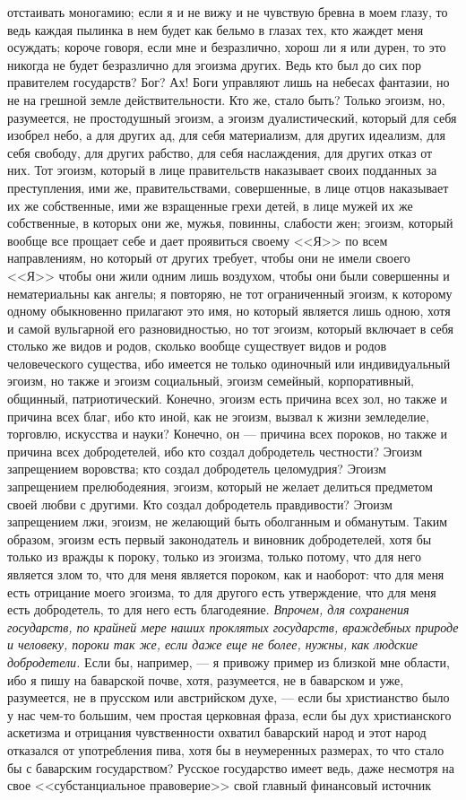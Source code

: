 \documentclass[12pt]{article}
\begin{document}
отстаивать моногамию; если я и не вижу и не чувствую бревна в моем глазу, то ведь каждая пылинка в нем будет как бельмо в глазах тех, кто жаждет меня осуждать; короче говоря, если мне и безразлично, хорош ли я или дурен, то это никогда не будет безразлично для эгоизма других. Ведь кто был до сих пор правителем государств? Бог? Ах! Боги управляют лишь на небесах фантазии, но не на грешной земле действительности. Кто же, стало быть? Только эгоизм, но, разумеется, не простодушный эгоизм, а эгоизм дуалистический, который для себя изобрел небо, а для других ад, для себя материализм, для других идеализм, для себя свободу, для других рабство, для себя наслаждения, для других отказ от них. Тот эгоизм, который в лице правительств наказывает своих подданных за преступления, ими же, правительствами, совершенные, в лице отцов наказывает их же собственные, ими же взращенные грехи детей, в лице мужей их же собственные, в которых они же, мужья, повинны, слабости жен; эгоизм, который вообще все прощает себе и дает проявиться своему <<Я>> по всем направлениям, но который от других требует, чтобы они не имели своего <<Я>>  чтобы они жили одним лишь воздухом, чтобы они были совершенны и нематериальны как ангелы; я повторяю, не тот ограниченный эгоизм, к которому одному обыкновенно прилагают это имя, но который является лишь одною, хотя и самой вульгарной его разновидностью, но тот эгоизм, который включает в себя столько же видов и родов, сколько вообще существует видов и родов человеческого существа, ибо имеется не только одиночный или индивидуальный эгоизм, но также и эгоизм социальный, эгоизм семейный, корпоративный, общинный, патриотический. Конечно, эгоизм есть причина всех зол, но также и причина всех благ, ибо кто иной, как не эгоизм, вызвал к жизни земледелие, торговлю, искусства и науки? Конечно, он --- причина всех пороков, но также и причина всех добродетелей, ибо кто создал добродетель честности? Эгоизм запрещением воровства; кто создал добродетель целомудрия? Эгоизм запрещением прелюбодеяния, эгоизм, который не желает делиться предметом своей любви с другими. Кто создал добродетель правдивости? Эгоизм запрещением лжи, эгоизм, не желающий быть оболганным и обманутым. Таким образом, эгоизм есть первый законодатель и виновник добродетелей, хотя бы только из вражды к пороку, только из эгоизма, только потому, что для него является злом то, что для меня является пороком, как и наоборот: что для меня есть отрицание моего эгоизма, то для другого есть утверждение, что для меня есть добродетель, то для него есть благодеяние. \emph{Впрочем, для сохранения государств, по крайней мере наших проклятых государств, враждебных природе и человеку, пороки так же, если даже еще не более, нужны, как людские добродетели.} Если бы, например, --- я привожу пример из близкой мне области, ибо я пишу на баварской почве, хотя, разумеется, не в баварском и уже, разумеется, не в прусском или австрийском духе, --- если бы христианство было у нас чем-то большим, чем простая церковная фраза, если бы дух христианского аскетизма и отрицания чувственности охватил баварский народ и этот народ отказался от употребления пива, хотя бы в неумеренных размерах, то что стало бы с баварским государством? Русское государство имеет ведь, даже несмотря на свое <<субстанциальное правоверие>>  свой главный финансовый источник 
\end{document}
